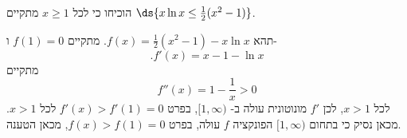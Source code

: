 הוכיחו כי לכל \(x \geq 1\) מתקיים $\ds{x \ln x \leq \frac{1}{2}(x^2 - 1)}$.
\begin{solbox}
תהא
$f(x)=\frac{1}{2}(x^2-1)-x\ln x$.
מתקיים
$f(1)=0$
ו-
$$.f'(x)=x-1-\ln x$$
מתקיים
$$f''(x)=1-\frac{1}{x}>0$$
לכל
$x>1$,
לכן
$f'$
מונוטונית עולה ב-
$[1,\infty)$,
בפרט
$f'(x)>f'(1)=0$
לכל
$x>1$.
מכאן נסיק כי בתחום
$[1,\infty)$
הפונקציה
$f$
עולה,
בפרט
$f(x)>f(1)=0$,
מכאן הטענה.

\end{solbox}
